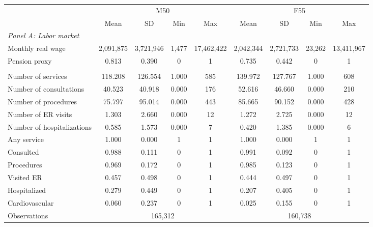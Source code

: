 \begin{tabular}{lcccccccc}
\toprule
& \multicolumn{4}{c}{M50} & \multicolumn{4}{c}{F55} \\
\cmidrule(l){2-5} \cmidrule(l){6-9}
& Mean & SD & Min & Max & Mean & SD & Min & Max \\
\midrule
\multicolumn{9}{l}{\textit{Panel A: Labor market}} \\
Monthly real wage &     2,091,875 &     3,721,946 &         1,477 &    17,462,422 &     2,042,344 &     2,721,733 &        23,262 &    13,411,967 \\ 
Pension proxy &         0.813 &         0.390 &             0 &             1 &         0.735 &         0.442 &             0 &             1 \\ \addlinespace
\multicolumn{9}{l}{\textit{Panel B: Health}} \\
Number of services &    118.208 &    126.554 &      1.000 &           585 &    139.972 &    127.767 &      1.000 &           608 \\ 
Number of consultations &     40.523 &     40.918 &      0.000 &           176 &     52.616 &     46.660 &      0.000 &           210 \\ 
Number of procedures &     75.797 &     95.014 &      0.000 &           443 &     85.665 &     90.152 &      0.000 &           428 \\ 
Number of ER visits &      1.303 &      2.660 &      0.000 &            12 &      1.272 &      2.725 &      0.000 &            12 \\ 
Number of hospitalizations &      0.585 &      1.573 &      0.000 &             7 &      0.420 &      1.385 &      0.000 &             6 \\ 
Any service &      1.000 &      0.000 &          1 &          1 &      1.000 &      0.000 &          1 &          1 \\ 
Consulted &      0.988 &      0.111 &          0 &          1 &      0.991 &      0.092 &          0 &          1 \\ 
Procedures &      0.969 &      0.172 &          0 &          1 &      0.985 &      0.123 &          0 &          1 \\ 
Visited ER &      0.457 &      0.498 &          0 &          1 &      0.444 &      0.497 &          0 &          1 \\ 
Hospitalized &      0.279 &      0.449 &          0 &          1 &      0.207 &      0.405 &          0 &          1 \\ 
Cardiovascular &      0.060 &      0.237 &          0 &          1 &      0.025 &      0.155 &          0 &          1 \\ 
\midrule
Observations & \multicolumn{4}{c}{165,312} & \multicolumn{4}{c}{160,738} \\
\bottomrule
\end{tabular}
